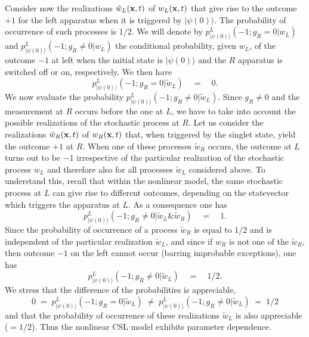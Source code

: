 \documentclass[10pt,a4paper]{article}
\begin{document}
Consider now the realizations $\tilde w_{L}({\bf x}, t)$ of
$w_{L}({\bf x}, t)$ that give rise to the outcome $+ 1$ for the
left apparatus when it is triggered by $|\psi(0)\rangle$. The
probability of occurrence of such processes is $1/2$. We will
denote by $p^{L}_{|\psi(0)\rangle}(-1; g_{R} = 0|w_{L})$ and
$p^{L}_{|\psi(0)\rangle}(-1; g_{R} \neq 0|w_{L})$ the conditional
probability, given $w_{L}$, of the outcome $-1$ at left when the
initial state is $|\psi(0)\rangle$ and the $R$ apparatus is
switched off or on, respectively. We then have
\begin{equation}
p^{L}_{|\psi(0)\rangle}(-1; g_{R} = 0|\tilde w_{L}) \quad = \quad
0.
\end{equation}
We now evaluate the probability $p^{L}_{|\psi(0)\rangle}(-1; g_{R}
\neq 0|\tilde w_{L})$. Since $g_{R} \neq 0$ and the measurement at
$R$ occurs before the one at $L$, we have to take into account the
possible realizations of the stochastic process at $R$. Let us
consider the realizations $\tilde w_{R}({\bf x}, t)$ of
$w_{R}({\bf x}, t)$ that, when triggered by the singlet state,
yield the outcome $+ 1$ at $R$. When one of these processes
$\tilde w_{R}$ occurs, the outcome at $L$ turns out to be $-1$
irrespective of the particular realization of the stochastic
process $w_{L}$ and therefore also for all processes $\tilde
w_{L}$ considered above. To understand this, recall that within
the nonlinear model, the same stochastic process at $L$ can give
rise to different outcomes, depending on the statevector which
triggers the apparatus at $L$. As a consequence one has
\begin{equation}
p^{L}_{|\psi(0)\rangle}(-1; g_{R} \neq 0|\tilde w_{L} \& \tilde
w_{R}) \quad = \quad 1.
\end{equation}
Since the probability of occurrence of a process $\tilde w_{R}$ is
equal to $1/2$ and is independent of the particular realization
$\tilde w_{L}$, and since if $w_{R}$ is not one of the $\tilde
w_{R}$, then outcome $-1$ on the left cannot occur (barring
improbable exceptions), one has
\begin{equation}
p^{L}_{|\psi(0)\rangle}(-1; g_{R} \neq 0|\tilde w_{L}) \quad =
\quad 1/2.
\end{equation}
We stress that the difference of the probabilities is appreciable,
\begin{equation}
0\; = \; p^{L}_{|\psi(0)\rangle}(-1; g_{R} = 0|\tilde w_{L}) \;
\neq \;  p^{L}_{|\psi(0)\rangle}(-1; g_{R} \neq 0|\tilde w_{L})\;
= \; 1/2
\end{equation}
and that the probability of occurrence of these realizations
$\tilde w_{L}$ is also appreciable ($= 1/2$). Thus the nonlinear
CSL model exhibits parameter dependence.
\end{document}
